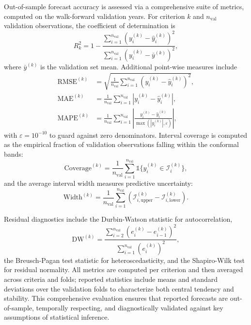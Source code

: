 \documentclass[12pt,a4paper]{article}
\begin{document}
Out-of-sample forecast accuracy is assessed via a comprehensive suite of metrics, computed on the walk-forward validation years. For criterion $k$ and $n_{\text{val}}$ validation observations, the coefficient of determination is
\begin{equation}
R_k^2 = 1 - \frac{\sum_{i=1}^{n_{\text{val}}} (y_i^{(k)} - \widehat{y}_i^{(k)})^2}{\sum_{i=1}^{n_{\text{val}}} (y_i^{(k)} - \bar{y}^{(k)})^2},
\end{equation}
where $\bar{y}^{(k)}$ is the validation set mean. Additional point-wise measures include
\begin{align}
\text{RMSE}^{(k)} &= \sqrt{\frac{1}{n_{\text{val}}} \sum_{i=1}^{n_{\text{val}}} (y_i^{(k)} - \widehat{y}_i^{(k)})^2}, \\
\text{MAE}^{(k)} &= \frac{1}{n_{\text{val}}} \sum_{i=1}^{n_{\text{val}}} |y_i^{(k)} - \widehat{y}_i^{(k)}|, \\
\text{MAPE}^{(k)} &= \frac{1}{n_{\text{val}}} \sum_{i=1}^{n_{\text{val}}} \left| \frac{y_i^{(k)} - \widehat{y}_i^{(k)}}{\max(|y_i^{(k)}|, \varepsilon)} \right|,
\end{align}
with $\varepsilon = 10^{-10}$ to guard against zero denominators. Interval coverage is computed as the empirical fraction of validation observations falling within the conformal bands:
\begin{equation}
\text{Coverage}^{(k)} = \frac{1}{n_{\text{val}}} \sum_{i=1}^{n_{\text{val}}} \mathbb{1}\{ y_i^{(k)} \in \mathcal{I}_i^{(k)} \},
\end{equation}
and the average interval width measures predictive uncertainty:
\begin{equation}
\text{Width}^{(k)} = \frac{1}{n_{\text{val}}} \sum_{i=1}^{n_{\text{val}}} (\mathcal{I}_{i,\text{upper}}^{(k)} - \mathcal{I}_{i,\text{lower}}^{(k)}).
\end{equation}

Residual diagnostics include the Durbin-Watson statistic for autocorrelation,
\begin{equation}
\text{DW}^{(k)} = \frac{\sum_{i=2}^{n_{\text{val}}} (e_i^{(k)} - e_{i-1}^{(k)})^2}{\sum_{i=1}^{n_{\text{val}}} (e_i^{(k)})^2},
\end{equation}
the Breusch-Pagan test statistic for heteroscedasticity, and the Shapiro-Wilk test for residual normality. All metrics are computed per criterion and then averaged across criteria and folds; reported statistics include means and standard deviations over the validation folds to characterize both central tendency and stability. This comprehensive evaluation ensures that reported forecasts are out-of-sample, temporally respecting, and diagnostically validated against key assumptions of statistical inference.
\end{document}
